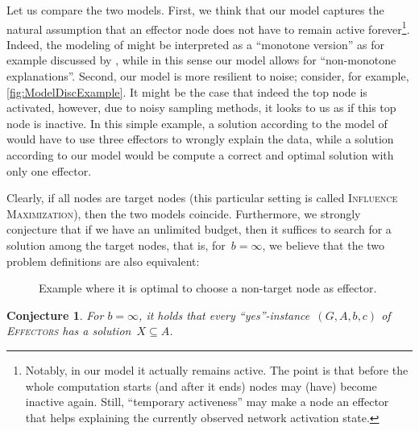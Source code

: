 \documentclass{article}
\newtheorem{conjecture}{Conjecture}
\newcommand{\probEffectors}{\textsc{Effectors}\xspace}
\begin{document}
Let us compare the two models.
First,
we think that our model captures the natural assumption that
an effector node does not have to remain active forever\footnote{Notably, in our model it actually remains active. The point is that before the whole computation starts (and after it ends) nodes may (have) become inactive again. Still, ``temporary activeness'' may make a node an effector that helps
explaining the currently observed network activation state.}.
Indeed, the modeling of \citet{LTGMH10} might be interpreted as a
``monotone version'' as for example discussed by \citet{ABS14}, 
while in this sense our model allows for ``non-monotone explanations''.
Second,
our model is more resilient to noise;
consider, for example, \autoref{fig:ModelDiscExample}.
It might be the case that indeed the top node is activated,
however,
due to noisy sampling methods,
it looks to us as if this top node is inactive.
In this simple example,
a solution according to the model of \citet{LTGMH10} would have to use three effectors to wrongly explain the data,
while a solution according to our model would be compute a correct and optimal solution with only one effector.


Clearly, if all nodes are target nodes (this particular setting is called \textsc{Influence Maximization}), 
then the two models coincide. 
Furthermore, we strongly conjecture that if we have an unlimited budget,
then it suffices to search for a solution
among the target nodes, that is, for~$b=\infty$, we believe that the two
problem definitions are also equivalent:

\begin{SCfigure}[2.3][t]
  \centering
  \label{fig:ModelDiscExample}
  \caption{Example where it is optimal to choose a non-target node as effector.}
\end{SCfigure}

\begin{conjecture}
  \label{con:infinite-budget}
  For $b = \infty$, it holds that every ``yes''-instance~$(G,A,b,c)$ of
  \probEffectors has a solution~$X \subseteq A$.
\end{conjecture}
\end{document}
